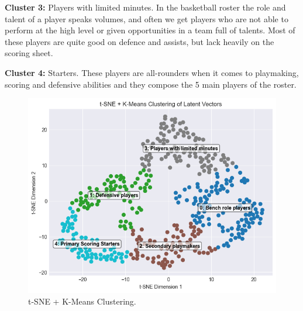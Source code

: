 \documentclass{article}
\begin{document}
{\bf Cluster 3:} Players with limited minutes. In the basketball roster the role and talent of a player speaks volumes, and often we get players who are not able to perform at the high level or given opportunities in a team full of talents. Most of these players are quite good on defence and assists, but lack heavily on the scoring sheet.

{\bf Cluster 4:} Starters. These players are all-rounders when it comes to playmaking, scoring and defensive abilities and they compose the 5 main players of the roster.

\begin{figure}[h]
    \centering
    \includegraphics[width=0.7\linewidth]{media/2c.png}
    \caption{t-SNE + K-Means Clustering.}
\end{figure}
\end{document}
